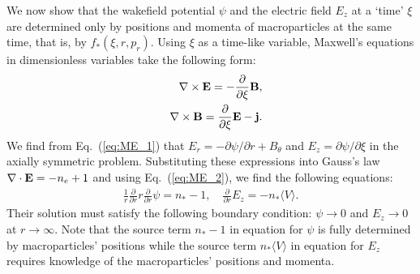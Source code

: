 \documentclass[twocolumn,showpacs,aip]{revtex4}
\begin{document}
We now show that the wakefield potential $\psi$  and the electric field  $E_z$  at a `time' $\xi$ are determined only by positions and momenta of macroparticles at the same time, that is, by  $f_*(\xi,r,p_r)$.
Using  $\xi$ as a time-like variable, Maxwell's equations in dimensionless variables take the following form:
\begin{eqnarray}
&&\nabla\times {\bf{E}}=-\frac{\partial}{\partial \xi}{\bf{B}},
\label{eq:ME_1}\\
&&\nabla\times {\bf{B}}=\frac{\partial}{\partial \xi}{\bf{E}}-{\bf{j}}.
\label{eq:ME_2}
\end{eqnarray}
We find from Eq.~(\ref{eq:ME_1}) that  $E_r=-\partial \psi/\partial r+B_{\theta}$ and $E_z=\partial \psi/\partial \xi$ in the axially symmetric problem. Substituting these expressions into Gauss's law $\nabla\cdot {\bf{E}}=-n_e+1$ and using  Eq.~(\ref{eq:ME_2}), we find the following equations:
\begin{eqnarray}
\frac{1}{r}\frac{\partial }{\partial r}r \frac{\partial }{\partial r}\psi=n_{*}-1, \quad 
\frac{\partial }{\partial r}E_z=-n_*\langle V\rangle.
\label{eq:Eq_for__psi}
\end{eqnarray}
 Their solution must satisfy the following boundary condition: $\psi\rightarrow 0$ and $E_z\rightarrow 0$ at $r\rightarrow \infty$.   Note that the source term $n_*-1$ in equation for $\psi$ is fully determined by macroparticles' positions while the source term $n_*\langle V\rangle$ in equation for $E_z$ requires knowledge of the macroparticles' positions and  momenta. 
\end{document}
